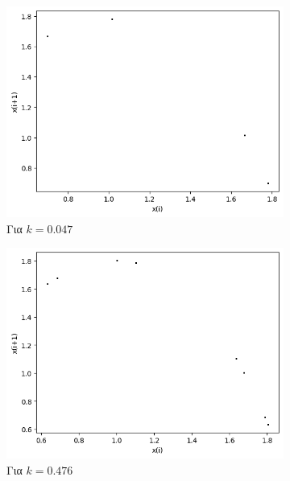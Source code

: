 \begin{figure}[ht]
\begin{subfigure}[b]{0.4\textwidth}
		\includegraphics[width=\textwidth]{LateX images/graphs/k047}
		\caption{Για $k=0.047$}
		\label{f:k3}
	\end{subfigure}
	\hfill
	\begin{subfigure}[b]{0.4\textwidth}
		\centering
		\includegraphics[width=\textwidth]{LateX images/graphs/k0476}
		\caption{Για $k=0.476$}
		\label{f:k4}
	\end{subfigure}
	\hfill
	\begin{subfigure}[b]{0.4\textwidth}
		\centering

\end{subfigure}
\end{figure}
